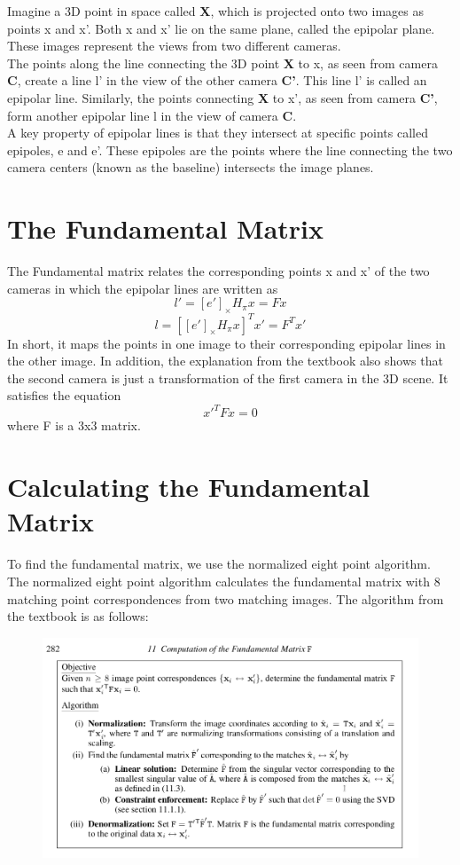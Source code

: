 \documentclass{article}
\begin{document}
Imagine a 3D point in space called \textbf{X}, which is projected onto two images as points x and x'. Both x and x' lie on the same plane, called the epipolar plane. These images represent the views from two different cameras. \\

The points along the line connecting the 3D point \textbf{X} to x, as seen from camera \textbf{C}, create a line l' in the view of the other camera \textbf{C'}. This line l' is called an epipolar line. Similarly, the points connecting \textbf{X} to x', as seen from camera \textbf{C'}, form another epipolar line l in the view of camera \textbf{C}. \\

A key property of epipolar lines is that they intersect at specific points called epipoles, e and e'. These epipoles are the points where the line connecting the two camera centers (known as the baseline) intersects the image planes.

\section{The Fundamental Matrix}
The Fundamental matrix relates the corresponding points x and x' of the two cameras in which the epipolar lines are written as 
$$l' = [e']_{\times} H_{\pi} x = F x$$
$$l = [[e']_{\times} H_{\pi} x]^Tx' = F^Tx'$$
In short, it maps the points in one image to their corresponding epipolar lines in the other image. In addition, the explanation from the textbook also shows that the second camera is just a transformation of the first camera in the 3D scene. It satisfies the equation
$$x'^TFx = 0$$
where F is a 3x3 matrix.

\section{Calculating the Fundamental Matrix}

To find the fundamental matrix, we use the normalized eight point algorithm. The normalized eight point algorithm calculates the fundamental matrix with 8 matching point correspondences from two matching images. The algorithm from the textbook is as follows:
\begin{figure}[H]
    \centering
    \includegraphics[width=1\textwidth]{eight_point_algorithm.png}
\end{figure}
\end{document}
